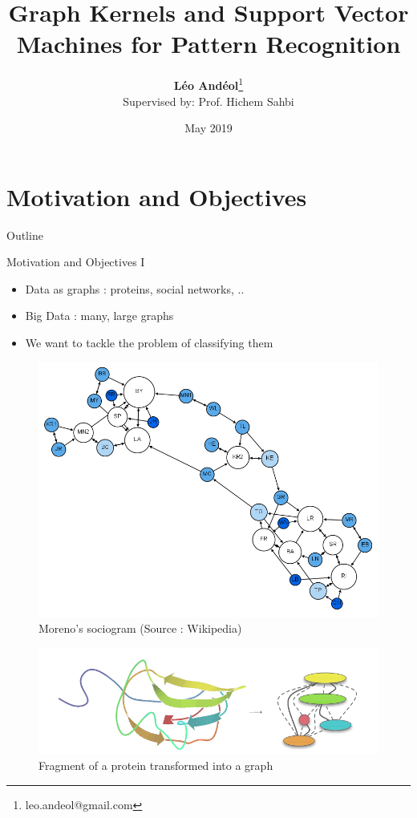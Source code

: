 \documentclass[compress]{beamer}
\title[Graph Kernels]{Graph Kernels and Support Vector Machines for Pattern Recognition}
\author[Léo Andéol]{\textbf{Léo Andéol}\thanks{leo.andeol@gmail.com}\\ \footnotesize Supervised by: Prof. Hichem Sahbi}
\institute[Sorbonne Uni.]{Master DAC - Sorbonne Université}
\date{May 2019}
\begin{document}
\begin{frame}
  \titlepage
\end{frame}

\section{Motivation and Objectives}
\begin{frame}{Outline}
  \tableofcontents[currentsection]
\end{frame}
\begin{frame}{Motivation and Objectives I}
\begin{multicols}{2}
	\begin{itemize}
		\item Data as graphs : proteins, social networks, ..
		\item Big Data : many, large graphs
		\item We want to tackle the problem of classifying them
	\end{itemize}
	\begin{figure}
		\includegraphics[height=.3\textheight]{data/sociogram.png}\par
		\caption*{\footnotesize Moreno's sociogram (Source : Wikipedia)}
	\end{figure}
\end{multicols}

\begin{figure}
	\centering
	\vspace*{-0.5cm}
	\includegraphics[height=.25\textheight]{data/ecoli.png}
\caption*{Fragment of a protein transformed into a graph \citep{vishwanathan_graph_2010}}
\end{figure}

\end{frame}
\end{document}
